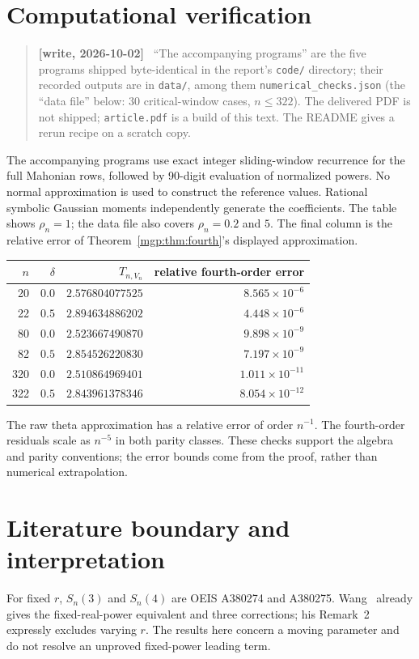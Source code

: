 \documentclass[11pt]{article}
\newenvironment{writenote}{\begin{quote}\small\sloppy\textbf{[write, 2026-10-02]}\ }{\end{quote}}
\newcommand{\V}{V_n}\newcommand{\T}{T_{n,r}}\newcommand{\Z}{\mathbb Z}\newcommand{\E}{\mathbb E}\newcommand{\dd}{\,d}
\begin{document}
\section{Computational verification}
\begin{writenote}
``The accompanying programs'' are the five programs shipped byte-identical in the report's
\texttt{code/} directory; their recorded outputs are in \texttt{data/}, among them
\texttt{numerical\_checks.json} (the ``data file'' below: 30 critical-window cases, $n\le322$). The
delivered PDF is not shipped; \texttt{article.pdf} is a build of this text. The README gives a
rerun recipe on a scratch copy.
\end{writenote}
The accompanying programs use exact integer sliding-window recurrence for the full Mahonian rows, followed by 90-digit evaluation of normalized powers. No normal approximation is used to construct the reference values. Rational symbolic Gaussian moments independently generate the coefficients. The table shows $\rho_n=1$; the data file also covers $\rho_n=0.2$ and $5$. The final column is the relative error of Theorem~\ref{mgp:thm:fourth}'s displayed approximation.
\begin{center}
\begin{tabular}{rrrr}
\toprule
$n$&$\delta$&$T_{n,\V}$&relative fourth-order error\\
\midrule
20&$0.0$&$2.576804077525$&$8.565\times10^{-6}$\\
22&$0.5$&$2.894634886202$&$4.448\times10^{-6}$\\
80&$0.0$&$2.523667490870$&$9.898\times10^{-9}$\\
82&$0.5$&$2.854526220830$&$7.197\times10^{-9}$\\
320&$0.0$&$2.510864969401$&$1.011\times10^{-11}$\\
322&$0.5$&$2.843961378346$&$8.054\times10^{-12}$\\
\bottomrule
\end{tabular}
\end{center}
The raw theta approximation has a relative error of order $n^{-1}$. The fourth-order residuals scale as $n^{-5}$ in both parity classes. These checks support the algebra and parity conventions; the error bounds come from the proof, rather than numerical extrapolation.

\section{Literature boundary and interpretation}
For fixed $r$, $S_n(3)$ and $S_n(4)$ are OEIS A380274 and A380275. Wang~\cite{wang} already gives the fixed-real-power equivalent and three corrections; his Remark~2 expressly excludes varying $r$. The results here concern a moving parameter and do not resolve an unproved fixed-power leading term.
\end{document}
